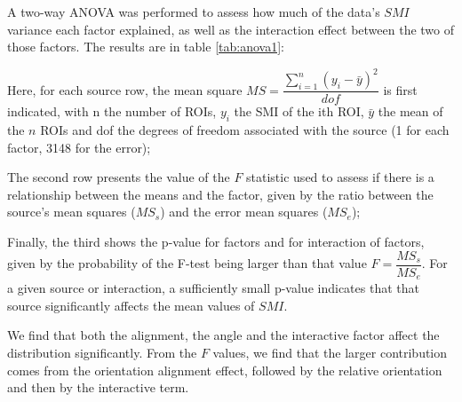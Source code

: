 A two-way ANOVA was performed to assess how much of the data's $SMI$ variance each factor explained, as well as the interaction effect between the two of those factors. The results are in table \ref{tab:anova1}: 

Here, for each source row, the mean square $MS=\dfrac{\sum_{i=1}^n(y_i-\bar{y})^2}{dof}$ is first indicated, with n the number of ROIs, $y_i$ the SMI of the ith ROI, $\bar{y}$ the mean of the $n$ ROIs and dof the degrees of freedom associated with the source (1 for each factor, 3148 for the error); 

The second row presents the value of the $F$ statistic used to assess if there is a relationship between the means and the factor, given by the ratio between the source's mean squares ($MS_s$) and the error mean squares ($MS_e$); 

Finally, the third shows the p-value for factors and for interaction of factors, given by the probability of the F-test being larger than that value $F=\dfrac{MS_s}{MS_e}$. For a given source or interaction, a sufficiently small p-value indicates that that source significantly affects the mean values of $SMI$. 

We find that both the alignment, the angle and the interactive factor affect the distribution significantly. From the $F$ values, we find that the larger contribution comes from the orientation alignment effect, followed by the relative orientation and then by the interactive term.

\begin{table}[H]
\begin{center}\par
{}
 \caption{Two-way ANOVA results for the collinear versus flanking surround effect and iso-oriented versus cross-oriented C-S effect, and interactions.}
    \vspace{-5mm}
    \label{table1}
\end{center}
\end{table}

